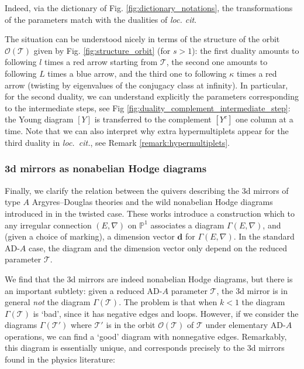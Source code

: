 \documentclass[11pt,a4paper]{amsart}
\numberwithin{equation}{section}
\begin{document}
Indeed, via the dictionary of Fig. \ref{fig:dictionary_notations}, the transformations of the parameters match with the dualities of \emph{loc. cit}.

The situation can be understood nicely in terms of the structure of the orbit $\mathcal O(\mathcal T)$ given by Fig. \ref{fig:structure_orbit} (for $s>1$): the first duality amounts to following $l$ times a red arrow starting from $\mathcal T$, the second one amounts to following $L$ times a blue arrow, and the third one to following $\kappa$ times a red arrow (twisting by eigenvalues of the conjugacy class at infinity). In particular, for the second duality, we can understand explicitly the parameters corresponding to the intermediate steps, see Fig \ref{fig:duality_complement_intermediate_step}: the Young diagram $[Y]$ is transferred to the complement $[Y^c]$ one column at a time. Note that we can also interpret why extra hypermultiplets appear for the third duality in \emph{loc.~cit.}, see Remark \ref{remark:hypermultiplets}.


\subsubsection{3d mirrors as nonabelian Hodge diagrams} Finally, we clarify the relation between the quivers describing the 3d mirrors of type $A$ Argyres--Douglas theories and the wild nonabelian Hodge diagrams introduced in \cite{boalch2020diagrams, doucot2021diagrams} in the twisted case. These works introduce a construction which to any irregular connection $(E,\nabla)$ on $\mathbb P^1$ associates a diagram $\Gamma(E,\nabla)$, and (given a choice of marking), a dimension vector $\mathbf d$ for $\Gamma(E,\nabla)$. In the standard AD-$A$ case, the diagram and the dimension vector only depend on the reduced parameter $\mathscr T$.

We find that the 3d mirrors are indeed nonabelian Hodge diagrams, but there is an important subtlety: given a reduced AD-$A$  parameter $\mathscr T$, the 3d mirror is in general \emph{not} the diagram $\Gamma(\mathscr T)$. The problem is that  when $k<1$ the diagram $\Gamma(\mathscr T)$ is `bad', since it has negative edges and loops. However, if we consider the diagrams $\Gamma(\mathcal T')$ where $\mathscr T'$ is in the orbit $\mathcal O(\mathscr T)$ of $\mathscr T$ under elementary AD-$A$ operations, we can find a `good' diagram with nonnegative edges. Remarkably, this diagram is essentially unique, and corresponds precisely to the 3d mirrors found in the physics literature:
\end{document}
